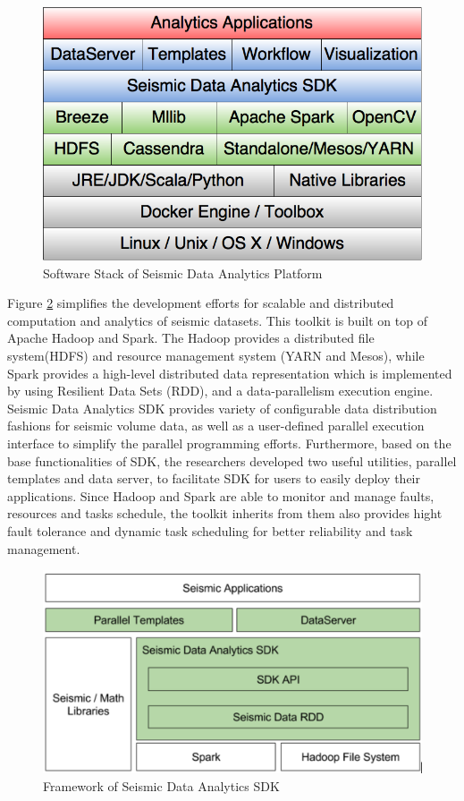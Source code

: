 \begin{figure}[h]
\centering
\includegraphics[scale=0.4]{figures/sdk_swstack.png}
\caption{Software Stack of Seismic Data Analytics Platform}
\label{sdk_swstack}
\end{figure}

Figure \ref{sdk_framework} simplifies the development efforts for scalable and distributed computation and analytics of seismic datasets. This toolkit is built on top of Apache Hadoop and Spark. The Hadoop provides a distributed file system(HDFS) and resource management system (YARN and Mesos), while Spark provides a high-level distributed data representation which is implemented by using Resilient Data Sets (RDD),  and a data-parallelism execution engine. Seismic Data Analytics SDK provides variety of configurable data distribution fashions for seismic volume data, as well as a user-defined parallel execution interface to simplify the parallel programming efforts. Furthermore, based on the base functionalities of SDK, the researchers developed two useful utilities, parallel templates and data server, to facilitate SDK for users to easily deploy their applications. Since Hadoop and Spark are able to monitor and manage faults, resources and tasks schedule, the toolkit inherits from them also provides hight fault tolerance and dynamic task scheduling for better reliability and task management.

\begin{figure}[h]
\centering
\includegraphics[scale=0.6]{figures/sdk_framework.png}
\caption{Framework of Seismic Data Analytics SDK}
\label{sdk_framework}
\end{figure}


